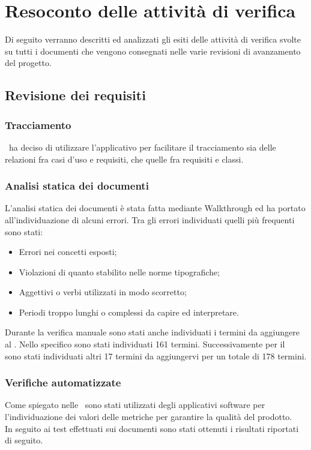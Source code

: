 \documentclass[../PianoDiQualifica.tex]{subfiles}
\begin{document}
\appendix
\section{Resoconto delle attività di verifica}
Di seguito verranno descritti ed analizzati gli esiti delle attività di verifica svolte su tutti i documenti che vengono consegnati nelle varie revisioni di avanzamento del progetto.
	
	\subsection{Revisione dei requisiti}
		\subsubsection{Tracciamento}
		\kpanic\ ha deciso di utilizzare l'applicativo  per facilitare il tracciamento sia delle relazioni fra casi d'uso e requisiti, che quelle fra requisiti e classi.
			
		\subsubsection{Analisi statica dei documenti}
		L'analisi statica dei documenti è stata fatta mediante Walkthrough ed ha portato all'individuazione di alcuni errori. Tra gli errori individuati quelli più frequenti sono stati:
		\begin{itemize}
			\item Errori nei concetti esposti;
			\item Violazioni di quanto stabilito nelle norme tipografiche;
			\item Aggettivi o verbi utilizzati in modo scorretto;
			\item Periodi troppo lunghi o complessi da capire ed interpretare.
		\end{itemize}
		Durante la verifica manuale sono stati anche individuati i termini da aggiungere al \glossarioRR. Nello specifico sono stati individuati 161 termini. Successivamente per il \glossarioRP\, sono stati individuati altri 17 termini da aggiungervi per un totale di 178 termini.
			
		\subsubsection{Verifiche automatizzate}
		Come spiegato nelle \normediprogetto\ sono stati utilizzati degli applicativi software per l'individuazione dei valori delle metriche per garantire la qualità del prodotto.\\
		In seguito ai test effettuati sui documenti sono stati ottenuti i risultati riportati di seguito. \\ \\
		
\end{document}
